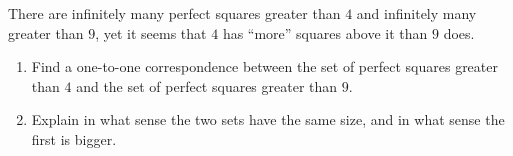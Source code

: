 There are infinitely many perfect squares greater than $4$ and infinitely many greater than $9$, yet it seems that $4$ has ``more'' squares above it than $9$ does.
\begin{enumerate}
\item[(a)] Find a one-to-one correspondence between the set of perfect squares greater than $4$ and the set of perfect squares greater than $9$.
\item[(b)] Explain in what sense the two sets have the same size, and in what sense the first is bigger.
\end{enumerate}
